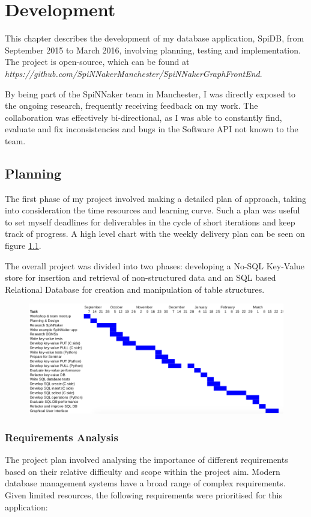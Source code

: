 \chapter{Development}
\label{cha:development}
This chapter describes the development of my database application, SpiDB, from September 2015 to March 2016, involving planning, testing and implementation. The project is open-source, which can be found at
\textit{https://github.com/SpiNNakerManchester/SpiNNakerGraphFrontEnd}.

By being part of the SpiNNaker team in Manchester, I was directly exposed to the ongoing research, frequently receiving feedback on my work. The collaboration was effectively bi-directional, as I was able to constantly find, evaluate and fix inconsistencies and bugs in the Software API not known to the team.

\section{Planning}
The first phase of my project involved making a detailed plan of approach, taking into consideration the time resources and learning curve. Such a plan was useful to set myself deadlines for deliverables in the cycle of short iterations and keep track of progress. A high level chart with the weekly delivery plan can be seen on figure \ref{fig:plan}.

The overall project was divided into two phases: developing a No-SQL Key-Value store for insertion and retrieval of non-structured data and an SQL based Relational Database for creation and manipulation of table structures. 

\begin{figure}
\center
  \includegraphics[width=1.3\linewidth, natwidth=950, natheight=410]{images/plan.png}
  \label{fig:plan}
\end{figure}

\subsection{Requirements Analysis}
The project plan involved analysing the importance of different requirements based on their relative difficulty and scope within the project aim. Modern database management systems have a broad range of complex requirements. Given limited resources, the following requirements were prioritised for this application:

